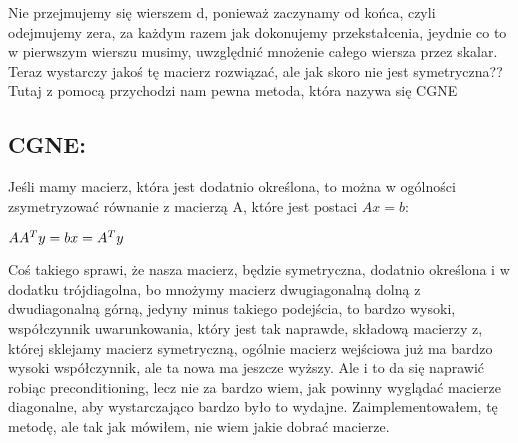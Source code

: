 \documentclass[12pt]{article}
\begin{document}
Nie przejmujemy się wierszem d, ponieważ zaczynamy od końca, czyli odejmujemy zera, za każdym razem jak dokonujemy przekstałcenia, jeydnie co to w pierwszym wierszu musimy, uwzględnić mnożenie całego wiersza przez skalar. Teraz wystarczy jakoś tę macierz rozwiązać, ale jak skoro nie jest symetryczna?? Tutaj z pomocą przychodzi nam pewna metoda, która nazywa się CGNE
\subsection{CGNE: }
Jeśli mamy macierz, która jest dodatnio określona, to można w ogólności zsymetryzować równanie z macierzą A, które jest postaci $Ax=b$:
\begin{center}
$
AA^{T}y=b \newline
x=A^{T}y
$
\end{center}
Coś takiego sprawi, że nasza macierz, będzie symetryczna, dodatnio określona i w dodatku trójdiagolna, bo mnożymy macierz dwugiagonalną dolną z dwudiagonalną górną, jedyny minus takiego podejścia, to bardzo wysoki, współczynnik uwarunkowania, który jest tak naprawde, składową macierzy z, której sklejamy macierz symetryczną, ogólnie macierz wejściowa już ma bardzo wysoki współczynnik, ale ta nowa ma jeszcze wyższy. Ale i to da się naprawić robiąc preconditioning, lecz nie za bardzo wiem, jak powinny wyglądać macierze diagonalne, aby wystarczająco bardzo było to wydajne. Zaimplementowałem, tę metodę, ale tak jak mówiłem, nie wiem jakie dobrać macierze.
\end{document}
